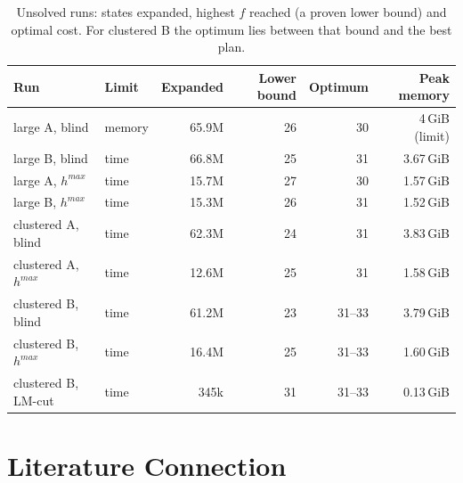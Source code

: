 \documentclass[11pt,a4paper]{article}
\newcommand{\p}[1]{\texttt{\detokenize{#1}}}
\begin{document}
\begin{table}[H]
  \centering\small
  \begin{tabular}{@{}l l r r r r@{}}
    \toprule
    Run & Limit & Expanded & Lower bound & Optimum & Peak memory \\
    \midrule
    large A, blind          & memory & 65.9M  & 26 & 30 & 4\,GiB (limit) \\
    large B, blind          & time   & 66.8M  & 25 & 31 & 3.67\,GiB \\
    large A, $h^{max}$      & time   & 15.7M  & 27 & 30 & 1.57\,GiB \\
    large B, $h^{max}$      & time   & 15.3M  & 26 & 31 & 1.52\,GiB \\
    clustered A, blind      & time   & 62.3M  & 24 & 31 & 3.83\,GiB \\
    clustered A, $h^{max}$  & time   & 12.6M  & 25 & 31 & 1.58\,GiB \\
    clustered B, blind      & time   & 61.2M  & 23 & 31--33 & 3.79\,GiB \\
    clustered B, $h^{max}$  & time   & 16.4M  & 25 & 31--33 & 1.60\,GiB \\
    clustered B, LM-cut     & time   & 345k   & 31 & 31--33 & 0.13\,GiB \\
    \bottomrule
  \end{tabular}
  \caption{Unsolved runs: states expanded, highest $f$ reached (a proven
    lower bound) and optimal cost. For clustered B the optimum lies between
    that bound and the best \p{lama} plan.}
  \label{tab:unsolved}
\end{table}

\section{Literature Connection}
\label{sec:literature}
\end{document}
